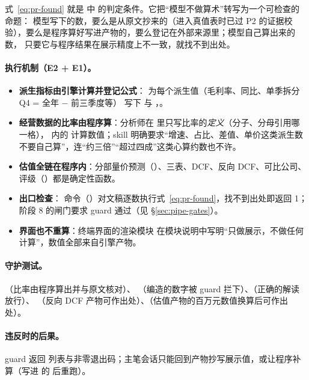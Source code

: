 式~\eqref{eq:pr-found} 就是  中  的判定条件。它把“模型不做算术”转写为一个可检查的命题：
模型写下的数，要么是从原文抄来的（进入真值表时已过 P2 的证据校验），要么是程序算好写进产物的，要么登记在外部来源里；模型自己算出来的数，
只要它与程序结果在展示精度上不一致，就找不到出处。

\paragraph{执行机制（E2 + E1）。}
\begin{itemize}
  \item \textbf{派生指标由引擎计算并登记公式}： 为每个派生值（毛利率、同比、单季拆分 Q4 = 全年 − 前三季度等）
        写下  与 ，。
  \item \textbf{经营数据的比率由程序算}：分析师在  里只写比率的\emph{定义}（分子、分母引用哪一格），
         内的  计算数值；skill 明确要求“增速、占比、差值、单价这类派生数不要自己算”，连“约三倍”“超过四成”这类心算约数也不许。
  \item \textbf{估值全链在程序内}：分部量价预测（）、三表、DCF、反向 DCF、可比公司、评级（）都是确定性函数。
  \item \textbf{出口检查}： 命令（）对文稿逐数执行式~\eqref{eq:pr-found}，找不到出处即返回 1；阶段 8 的闸门要求 guard 通过（见 \S\ref{sec:pipe-gates}）。
  \item \textbf{界面也不重算}：终端界面的渲染模块  在模块说明中写明“只做展示，不做任何计算”，数值全部来自引擎产物。
\end{itemize}

\paragraph{守护测试。}（比率由程序算出并与原文核对）、
（编造的数字被 guard 拦下）、（正确的解读放行）、
（反向 DCF 产物可作出处）、（估值产物的百万元数值换算后可作出处）。

\paragraph{违反时的后果。}guard 返回  列表与非零退出码；主笔会话只能回到产物抄写展示值，或让程序补算（写进  的  后重跑）。

